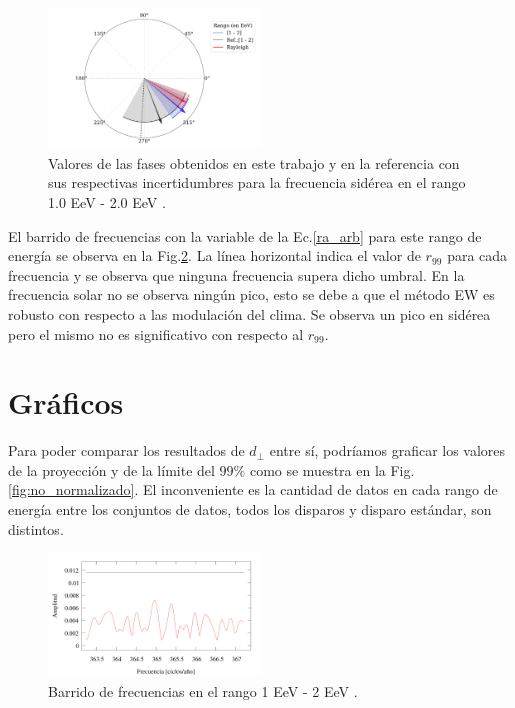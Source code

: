     \begin{figure}[H]
        \begin{small}
            \begin{center}
                \includegraphics[width=0.5\textwidth]{phase_tercer_bin.pdf}
            \end{center}
        \caption{Valores de las fases obtenidos en este trabajo y en la referencia con sus respectivas incertidumbres para la frecuencia sidérea en el  rango 1.0 EeV - 2.0 EeV .}
        \label{fig:tercer}
        \end{small}
    \end{figure}


    El barrido de frecuencias con la variable de la Ec.\ref{ra_arb} para este rango de energía se observa en la Fig.\ref{fig:tercer_barrido}. La línea horizontal indica el valor de $r_{99}$ para cada frecuencia y se observa que ninguna frecuencia supera dicho umbral. En la frecuencia solar no se observa ningún pico, esto se debe a que el método EW es robusto con respecto a las modulación del clima. Se observa un pico en sidérea pero el mismo no es significativo con respecto al $r_{99}$.

    \section*{Gráficos}

    Para poder comparar los resultados de $d_\perp$ entre sí, podríamos graficar los valores de la proyección y de la límite del $99\%$ como se muestra en la Fig.\ref{fig:no_normalizado}. El inconveniente es la cantidad de datos en cada rango de energía entre los conjuntos de datos, todos los disparos y disparo estándar, son distintos.

    \begin{figure}[H]
        \begin{small}
            \begin{center}
                \includegraphics[width=0.5\textwidth]{plot_bin_3_barrido.pdf}
            \end{center}
            \caption{Barrido de frecuencias en el  rango 1 EeV - 2 EeV .}
            \label{fig:tercer_barrido}
        \end{small}
    \end{figure}    


